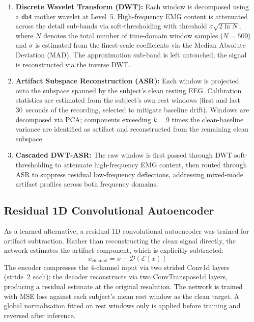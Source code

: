 \documentclass[11pt,a4paper]{article}
\begin{document}
\begin{enumerate}
    \item \textbf{Discrete Wavelet Transform (DWT):} Each window is decomposed using a \texttt{db4} mother wavelet at Level~5. High-frequency EMG content is attenuated across the detail sub-bands via soft-thresholding with threshold $\sigma\sqrt{2\ln N}$, where $N$ denotes the total number of time-domain window samples ($N=500$) and $\sigma$ is estimated from the finest-scale coefficients via the Median Absolute Deviation (MAD). The approximation sub-band is left untouched; the signal is reconstructed via the inverse DWT.

    \item \textbf{Artifact Subspace Reconstruction (ASR):} Each window is projected onto the subspace spanned by the subject's clean resting EEG. Calibration statistics are estimated from the subject's own rest windows (first and last 30~seconds of the recording, selected to mitigate baseline drift). Windows are decomposed via PCA; components exceeding $k=9$ times the clean-baseline variance are identified as artifact and reconstructed from the remaining clean subspace.

    \item \textbf{Cascaded DWT-ASR:} The raw window is first passed through DWT soft-thresholding to attenuate high-frequency EMG content, then routed through ASR to suppress residual low-frequency deflections, addressing mixed-mode artifact profiles across both frequency domains.
\end{enumerate}

\subsection{Residual 1D Convolutional Autoencoder}
As a learned alternative, a residual 1D convolutional autoencoder was trained for artifact subtraction. Rather than reconstructing the clean signal directly, the network estimates the artifact component, which is explicitly subtracted:
$$x_{\text{cleaned}} = x - \mathcal{D}\!\left(\mathcal{E}(x)\right)$$
The encoder compresses the 4-channel input via two strided Conv1d layers (stride~2 each); the decoder reconstructs via two ConvTranspose1d layers, producing a residual estimate at the original resolution. The network is trained with MSE loss against each subject's mean rest window as the clean target. A global normalisation fitted on rest windows only is applied before training and reversed after inference.
\end{document}
